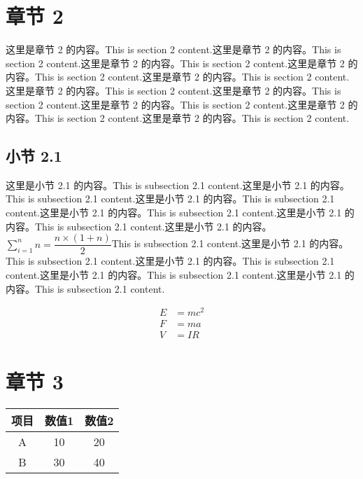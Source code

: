 \documentclass[UTF8]{article}
\begin{document}
	\section{章节 2}

	这里是章节 2 的内容。This is section 2 content.这里是章节 2 的内容。This is section 2 content.这里是章节 2 的内容。This is section 2 content.这里是章节 2 的内容。This is section 2 content.这里是章节 2 的内容。This is section 2 content.这里是章节 2 的内容。This is section 2 content.这里是章节 2 的内容。This is section 2 content.这里是章节 2 的内容。This is section 2 content.这里是章节 2 的内容。This is section 2 content.这里是章节 2 的内容。This is section 2 content.\cite{test2}

		\subsection{小节 2.1}

			这里是小节 2.1 的内容。This is subsection 2.1 content.这里是小节 2.1 的内容。This is subsection 2.1 content.这里是小节 2.1 的内容。This is subsection 2.1 content.这里是小节 2.1 的内容。This is subsection 2.1 content.这里是小节 2.1 的内容。This is subsection 2.1 content.这里是小节 2.1 的内容。$\sum_{i=1}^{n}n = \dfrac{n \times \left(1 + n\right)}{2}$This is subsection 2.1 content.这里是小节 2.1 的内容。This is subsection 2.1 content.这里是小节 2.1 的内容。This is subsection 2.1 content.这里是小节 2.1 的内容。This is subsection 2.1 content.这里是小节 2.1 的内容。This is subsection 2.1 content.\cite{test1}

			$$
				\begin{aligned}
					E & = mc^2 \\
					F & = ma \\
					V & = IR
				\end{aligned}
			$$

	\newpage
	\section{章节 3}

	\begin{figure}[htbp]
		\centering
		\label{fig:example}
	\end{figure}

	\begin{table}[htbp]
		\centering
		\begin{tabular}{ccc}
			\toprule
			项目 & 数值1 & 数值2 \\
			\midrule
			A & 10 & 20 \\
			B & 30 & 40 \\
			\bottomrule
		\end{tabular}
		\label{tab:example}
	\end{table}
\end{document}
